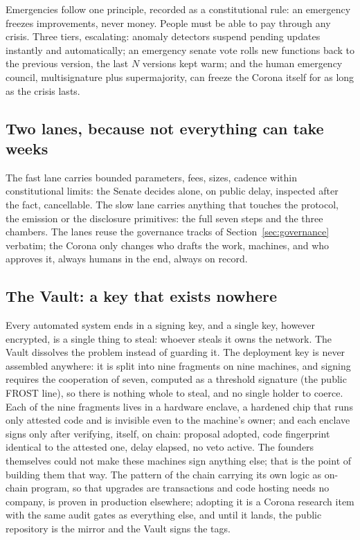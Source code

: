 Emergencies follow one principle, recorded as a constitutional rule: an
emergency freezes improvements, never money. People must be able to pay
through any crisis. Three tiers, escalating: anomaly detectors suspend
pending updates instantly and automatically; an emergency senate vote
rolls new functions back to the previous version, the last $N$ versions
kept warm; and the human emergency council, multisignature plus
supermajority, can freeze the Corona itself for as long as the crisis
lasts.

\subsection{Two lanes, because not everything can take weeks}

The fast lane carries bounded parameters, fees, sizes, cadence within
constitutional limits: the Senate decides alone, on public delay,
inspected after the fact, cancellable. The slow lane carries anything
that touches the protocol, the emission or the disclosure primitives:
the full seven steps and the three chambers. The lanes reuse the
governance tracks of Section~\ref{sec:governance} verbatim; the Corona
only changes who drafts the work, machines, and who approves it, always
humans in the end, always on record.

\subsection{The Vault: a key that exists nowhere}

Every automated system ends in a signing key, and a single key, however
encrypted, is a single thing to steal: whoever steals it owns the
network. The Vault dissolves the problem instead of guarding it. The
deployment key is never assembled anywhere: it is split into nine
fragments on nine machines, and signing requires the cooperation of
seven, computed as a threshold signature (the public FROST line), so
there is nothing whole to steal, and no single holder to coerce. Each
of the nine fragments lives in a hardware enclave, a hardened chip that
runs only attested code and is invisible even to the machine's owner;
and each enclave signs only after verifying, itself, on chain: proposal
adopted, code fingerprint identical to the attested one, delay elapsed,
no veto active. The founders themselves could not make these machines
sign anything else; that is the point of building them that way. The
pattern of the chain carrying its own logic as on-chain program, so
that upgrades are transactions and code hosting needs no company, is
proven in production elsewhere; adopting it is a Corona research item
with the same audit gates as everything else, and until it lands, the
public repository is the mirror and the Vault signs the tags.

